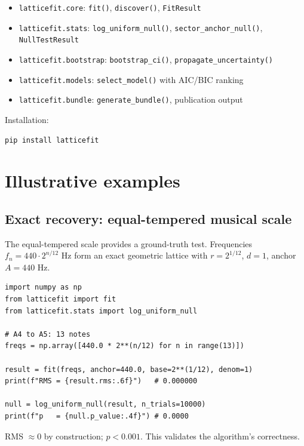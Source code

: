 \documentclass[preprint,12pt]{elsarticle}
\begin{document}
\begin{itemize}
\item \texttt{latticefit.core}: \texttt{fit()}, \texttt{discover()},
      \texttt{FitResult}
\item \texttt{latticefit.stats}: \texttt{log\_uniform\_null()},
      \texttt{sector\_anchor\_null()}, \texttt{NullTestResult}
\item \texttt{latticefit.bootstrap}: \texttt{bootstrap\_ci()},
      \texttt{propagate\_uncertainty()}
\item \texttt{latticefit.models}: \texttt{select\_model()} with
      AIC/BIC ranking
\item \texttt{latticefit.bundle}: \texttt{generate\_bundle()},
      publication output
\end{itemize}

Installation:
\begin{lstlisting}
pip install latticefit
\end{lstlisting}

\section{Illustrative examples}

\subsection{Exact recovery: equal-tempered musical scale}

The equal-tempered scale provides a ground-truth test. Frequencies
$f_n = 440 \cdot 2^{n/12}$ Hz form an exact geometric lattice
with $r = 2^{1/12}$, $d = 1$, anchor $A = 440$ Hz.

\begin{lstlisting}
import numpy as np
from latticefit import fit
from latticefit.stats import log_uniform_null

# A4 to A5: 13 notes
freqs = np.array([440.0 * 2**(n/12) for n in range(13)])

result = fit(freqs, anchor=440.0, base=2**(1/12), denom=1)
print(f"RMS = {result.rms:.6f}")   # 0.000000

null = log_uniform_null(result, n_trials=10000)
print(f"p   = {null.p_value:.4f}") # 0.0000
\end{lstlisting}

RMS $\approx 0$ by construction; $p < 0.001$. This validates the
algorithm's correctness.
\end{document}
